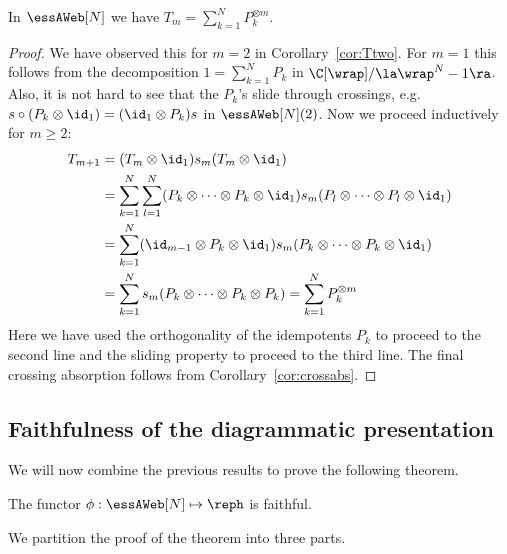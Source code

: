\begin{lemma}\label{lem:projexpand} In $\essAWeb[N]$ we have $T_m=\sum_{k=1}^N  P_k^{\otimes m}$.
\end{lemma}
\begin{proof} We have observed this for $m=2$ in Corollary~\ref{cor:Ttwo}. For $m=1$ this follows from the decomposition $1=\sum_{k=1}^N P_k$ in $\C[\wrap]/\la \wrap^N-1\ra$. Also, it is not hard to see that the $P_k$'s slide through crossings, e.g. $s \circ (P_k\otimes \id_1)=(\id_1 \otimes P_k) s$ in $\essAWeb[N](2)$. Now we proceed inductively for $m\geq 2$:
\begin{align*}
T_{m+1} &= (T_m\otimes \id_1)s_m(T_m\otimes \id_1) \\
&= \sum_{k=1}^N\sum_{l=1}^N (P_k\otimes\cdots \otimes P_k\otimes \id_1)s_m(P_l\otimes\cdots \otimes P_l\otimes \id_1) 
\\&= \sum_{k=1}^N (\id_{m-1} \otimes P_k\otimes \id_1) s_m(P_k\otimes\cdots \otimes P_k\otimes \id_1)
\\&= \sum_{k=1}^N s_m (P_k\otimes\cdots \otimes P_k\otimes P_k) =\sum_{k=1}^N  P_k^{\otimes m}
\end{align*}
Here we have used the orthogonality of the idempotents $P_k$ to proceed to the second line and the sliding property to proceed to the third line. The final crossing absorption follows from Corollary~\ref{cor:crossabs}. 
\end{proof}

\subsection{Faithfulness of the diagrammatic presentation}
We will now combine the previous results to prove the following theorem.

\begin{theo} \label{thm:faithfulness}
    The functor $\phi:\essAWeb[N]\mapsto \reph$ is faithful.
\end{theo}



We partition the proof of the theorem into three parts.

